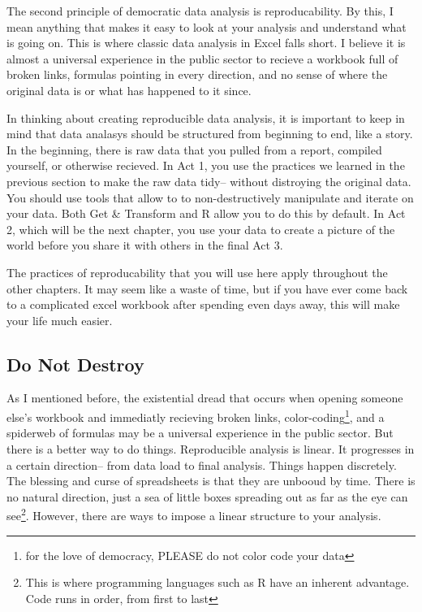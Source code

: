 \documentclass[]{book}
\begin{document}
The second principle of democratic data analysis is reproducability. By this, I mean anything that makes it easy to look at your analysis and understand what is going on. This is where classic data analysis in Excel falls short. I believe it is almost a universal experience in the public sector to recieve a workbook full of broken links, formulas pointing in every direction, and no sense of where the original data is or what has happened to it since.

In thinking about creating reproducible data analysis, it is important to keep in mind that data analasys should be structured from beginning to end, like a story. In the beginning, there is raw data that you pulled from a report, compiled yourself, or otherwise recieved. In Act 1, you use the practices we learned in the previous section to make the raw data tidy-- without distroying the original data. You should use tools that allow to to non-destructively manipulate and iterate on your data. Both Get \& Transform and R allow you to do this by default. In Act 2, which will be the next chapter, you use your data to create a picture of the world before you share it with others in the final Act 3.

The practices of reproducability that you will use here apply throughout the other chapters. It may seem like a waste of time, but if you have ever come back to a complicated excel workbook after spending even days away, this will make your life much easier.

\hypertarget{do-not-destroy}{%
\subsection{Do Not Destroy}\label{do-not-destroy}}

As I mentioned before, the existential dread that occurs when opening someone else's workbook and immediatly recieving broken links, color-coding\footnote{for the love of democracy, PLEASE do not color code your data}, and a spiderweb of formulas may be a universal experience in the public sector. But there is a better way to do things. Reproducible analysis is linear. It progresses in a certain direction-- from data load to final analysis. Things happen discretely. The blessing and curse of spreadsheets is that they are unbooud by time. There is no natural direction, just a sea of little boxes spreading out as far as the eye can see\footnote{This is where programming languages such as R have an inherent advantage. Code runs in order, from first to last}. However, there are ways to impose a linear structure to your analysis.
\end{document}
